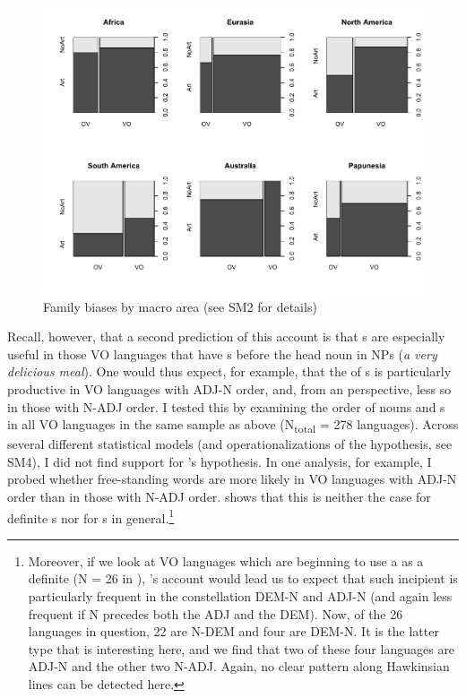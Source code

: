 \documentclass[output=paper]{langsci/langscibook}
\begin{document}
 
\begin{figure}
\includegraphics[width=\textwidth]{figures/ksb3.pdf}
\caption{Family biases by macro area (see SM2 for details)}
\label{fig:ksb:3}
\end{figure}
\newpage

Recall, however, that a second prediction of this account is that s are especially useful in those VO languages that have s before the head noun in NPs (\textit{a very delicious meal}). One would thus expect, for example, that the  of s is particularly productive in VO languages with ADJ-N order, and, from an  perspective, less so in those with N-ADJ order. I tested this by examining the order of nouns and s \citep{Dryer2013_Adj} in all VO languages in the same sample as above (N\textsubscript{total} = 278 languages). \newpage Across several different statistical models (and operationalizations of the hypothesis, see SM4), I did not find support for ’s  hypothesis. In one analysis, for example, I probed whether free-standing  words are more likely in VO languages with ADJ-N order than in those with N-ADJ order.  shows that this is neither the case for definite s nor for s in general.\footnote{Moreover, if we look at VO languages which are beginning to use a  as a definite  (N = 26 in \citealt{Dryer2013_Def}), ’s account would lead us to expect that such incipient  is particularly frequent in the constellation DEM-N and ADJ-N (and again less frequent if N precedes both the ADJ and the DEM). Now, of the 26 languages in question, 22 are N-DEM and four are DEM-N. It is the latter type that is interesting here, and we find that two of these four languages are ADJ-N and the other two N-ADJ. Again, no clear pattern along Hawkinsian lines can be detected here.} 
\end{document}
